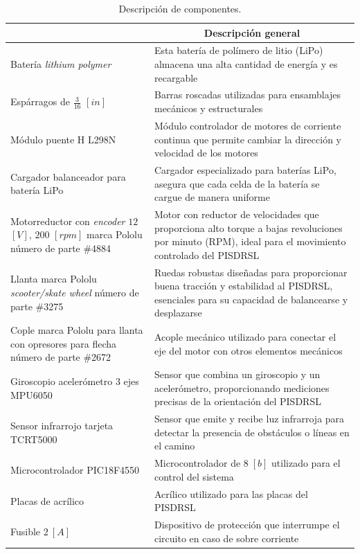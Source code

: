 \documentclass{article}
\begin{document}
\begin{table}[H]
	\centering
		\caption{Descripción de componentes.}
	\begin{tabular}{|p{5cm}|p{10cm}|}\hline
        \rowcolor{gray!30}
		\multicolumn{1}{|c|}{\textbf{Material}} & \multicolumn{1}{c|}{\textbf{Descripción general}} \\ \hline
		Batería \textit{lithium polymer} & Esta batería de polímero de litio (LiPo) almacena una alta cantidad de
            energía y es recargable \\\hline
		Espárragos de $\frac{3}{16}$ $[in]$ & Barras roscadas utilizadas para ensamblajes mecánicos y estructurales\\ \hline
		Módulo puente H L298N & Módulo controlador de motores de corriente continua que permite cambiar la dirección y velocidad de los motores \\ \hline
		Cargador balanceador para batería LiPo & Cargador especializado para baterías LiPo, asegura que cada celda de la
            batería se cargue de manera uniforme \\ \hline
		Motorreductor con \textit{encoder} $12$ $[V]$, $200$ $[rpm]$ marca Pololu número de parte \#4884 & Motor con reductor de velocidades que proporciona alto torque a bajas
            revoluciones por minuto (RPM), ideal para el movimiento controlado del PISDRSL \\ \hline
		Llanta marca Pololu \textit{scooter/skate wheel} número de parte \#3275 & Ruedas robustas diseñadas para proporcionar buena tracción y estabilidad al PISDRSL, esenciales para su capacidad de balancearse y desplazarse \\ \hline
		Cople marca Pololu para llanta con opresores para flecha número de parte \#2672 & Acople mecánico utilizado para conectar el eje del motor con otros elementos mecánicos \\ \hline
		Giroscopio acelerómetro 3 ejes MPU6050 & Sensor que combina un giroscopio y un acelerómetro, proporcionando mediciones precisas de la orientación del PISDRSL \\ \hline
		Sensor infrarrojo tarjeta TCRT5000 & Sensor que emite y recibe luz infrarroja para detectar la presencia de obstáculos o líneas en el camino \\ \hline
		Microcontrolador PIC18F4550 & Microcontrolador de $8\;[b]$ utilizado para el control del sistema \\ \hline
		Placas de acrílico & Acrílico utilizado para las placas del PISDRSL\\ \hline
		Fusible $2\:[A]$ & Dispositivo de protección que interrumpe el circuito en caso de sobre corriente \\ \hline

\end{tabular}
\end{table}
\end{document}
